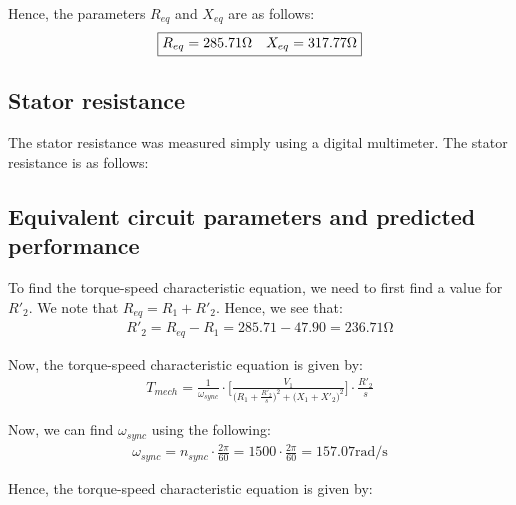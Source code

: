 \documentclass{article}
\begin{document}
Hence, the parameters $R_{eq}$ and $X_{eq}$ are as follows:
\begin{align*}
	\fbox{$R_{eq} = 285.71\si{\ohm} \quad X_{eq} = 317.77\si{\ohm}$}
\end{align*}

\subsection{Stator resistance}
The stator resistance was measured simply using a digital multimeter. The stator resistance is as follows:
\begin{center}
\end{center}

\subsection{Equivalent circuit parameters and predicted performance}

To find the torque-speed characteristic equation, we need to first find a value for $R'_2$. We note that $R_{eq} = R_1 + R'_2$. Hence, we see that:
\begin{align*}
	R'_2 = R_{eq} - R_1 = 285.71 - 47.90 = 236.71\si{\ohm}
\end{align*}

Now, the torque-speed characteristic equation is given by:
\begin{align*}
	T_{mech} = \frac{1}{\omega_{sync}} \cdot \bigg[\frac{V_1}{\big(R_1 + \frac{R'_2}{s}\big)^2 + \big(X_1 + X'_2\big)^2}\bigg] \cdot \frac{R'_2}{s}
\end{align*}

Now, we can find $\omega_{sync}$ using the following:
\begin{align*}
	\omega_{sync} = n_{sync} \cdot \frac{2 \pi}{60} = 1500 \cdot \frac{2 \pi}{60} = 157.07\si{\radian\per\second}
\end{align*}

Hence, the torque-speed characteristic equation is given by:
\begin{center}
\end{center}
\end{document}
